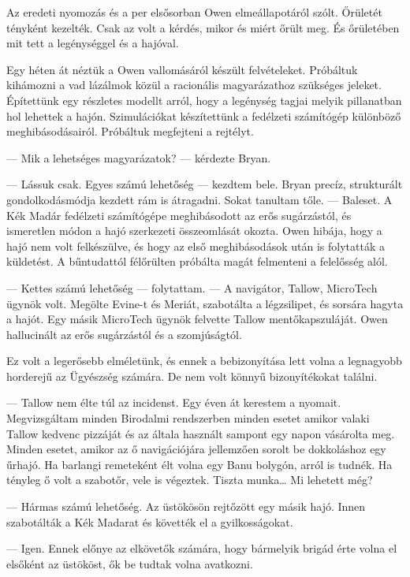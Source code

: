 \documentclass[10pt]{memoir}
\begin{document}
Az eredeti nyomozás és a per elsősorban Owen elmeállapotáról szólt. Őrületét
tényként kezelték. Csak az volt a kérdés, mikor és miért őrült meg. És
őrületében mit tett a legénységgel és a hajóval.

Egy héten át néztük a Owen vallomásáról készült felvételeket. Próbáltuk
kihámozni a vad lázálmok közül a racionális magyarázathoz szükséges jeleket.
Építettünk egy részletes modellt arról, hogy a legénység tagjai melyik
pillanatban hol lehettek a hajón. Szimulációkat készítettünk a fedélzeti
számítógép különböző meghibásodásairól. Próbáltuk megfejteni a rejtélyt.

--- Mik a lehetséges magyarázatok? --- kérdezte Bryan.

--- Lássuk csak. Egyes számú lehetőség --- kezdtem bele. Bryan precíz,
strukturált gondolkodásmódja kezdett rám is átragadni. Sokat tanultam tőle. ---
Baleset. A Kék Madár fedélzeti számítógépe meghibásodott az erős sugárzástól,
és ismeretlen módon a hajó szerkezeti összeomlását okozta. Owen hibája, hogy a
hajó nem volt felkészülve, és hogy az első meghibásodások után is folytatták a
küldetést. A bűntudattól félőrülten próbálta magát felmenteni a felelősség
alól.

--- Kettes számú lehetőség --- folytattam. --- A navigátor, Tallow, MicroTech
ügynök volt. Megölte Evine-t és Meriát, szabotálta a légzsilipet, és sorsára
hagyta a hajót. Egy másik MicroTech ügynök felvette Tallow mentőkapszuláját.
Owen hallucinált az erős sugárzástól és a szomjúságtól.

Ez volt a legerősebb elméletünk, és ennek a bebizonyítása lett volna a
legnagyobb horderejű az Ügyészség számára. De nem volt könnyű bizonyítékokat
találni.

--- Tallow nem élte túl az incidenst. Egy éven át kerestem a nyomait.
Megvizsgáltam minden Birodalmi rendszerben minden esetet amikor valaki Tallow
kedvenc pizzáját és az általa használt sampont egy napon vásárolta meg. Minden
esetet, amikor az ő navigációjára jellemzően sorolt be dokkoláshoz egy űrhajó.
Ha barlangi remeteként élt volna egy Banu bolygón, arról is tudnék. Ha tényleg
ő volt a szabotőr, vele is végeztek. Tiszta munka… Mi lehetett még?

--- Hármas számú lehetőség. Az üstökösön rejtőzött egy másik hajó. Innen
szabotálták a Kék Madarat és követték el a gyilkosságokat.

--- Igen. Ennek előnye az elkövetők számára, hogy bármelyik brigád érte volna
el elsőként az üstököst, ők be tudtak volna avatkozni.
\end{document}
